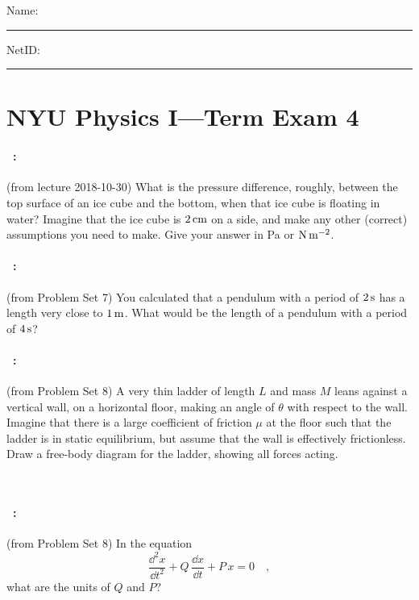 \documentclass[12pt]{article} 
\begin{document}
\noindent
Name: \rule[-1ex]{0.55\textwidth}{0.1pt}
NetID: \rule[-1ex]{0.2\textwidth}{0.1pt}

\section*{NYU Physics I---Term Exam 4}

\paragraph{\problemname~\theproblem:}%
(from lecture 2018-10-30)
What is the pressure difference, roughly, between the top surface
of an ice cube and the bottom, when that ice cube is floating in water?
Imagine that the ice cube is $2\,\mathrm{cm}$ on a side, and make any other
(correct) assumptions you need to make. Give your answer in Pa or $\mathrm{N}\,\mathrm{m}^{-2}$.

\vfill

\paragraph{\problemname~\theproblem:}%
(from Problem Set 7)
You calculated that a pendulum with a period of $2\,\mathrm{s}$ has a length
very close to $1\,\mathrm{m}$. What would be the length of a pendulum with
a period of $4\,\mathrm{s}$?

\vfill

\paragraph{\problemname~\theproblem:}%
(from Problem Set 8)
A very thin ladder of length $L$ and mass $M$ leans against a
vertical wall, on a horizontal floor, making an angle of $\theta$ with respect to the
wall. Imagine that there is a large coefficient of friction $\mu$ at the floor such that
the ladder is in static equilibrium, but assume that the wall is effectively
frictionless. Draw a free-body diagram for the ladder, showing all forces acting.

\vfill
~
\clearpage

\paragraph{\problemname~\theproblem:}%
(from Problem Set 8)
In the equation
$$
\frac{\dd^2 x}{\dd t^2} + Q\,\frac{\dd x}{\dd t} + P\,x = 0 \quad ,
$$ what are the units of $Q$ and $P$?
\end{document}
